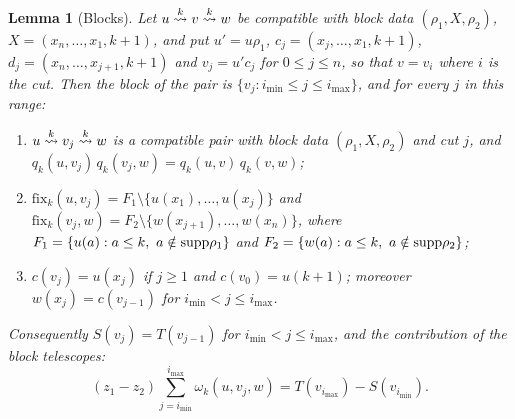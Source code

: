 \documentclass{amsart}
\newtheorem{lemma}{Lemma}[section]
\theoremstyle{definition}
\theoremstyle{remark}
\numberwithin{equation}{section}
\newcommand{\xrightsquigarrow}[2][]{%
	\mathrel{\mathop{\rightsquigarrow}\limits^{\scriptstyle #2}%
	\ifx\hfuzz#1\hfuzz\else_{\scriptstyle #1}\fi}%
}
\newcommand{\tom}[1]{\ensuremath{\xrightsquigarrow{#1}}}
\newcommand{\fx}{\mathrm{fix}}
\begin{document}
\begin{lemma}[Blocks] \label{lemma:blocks}
Let $u\tom{k}v\tom{k}w$ be compatible with block data $(\rho_1,X,\rho_2)$, $X=(x_n,\ldots,x_1,k+1)$, and put $u'=u\rho_1$, $c_j=(x_j,\ldots,x_1,k+1)$, $d_j=(x_n,\ldots,x_{j+1},k+1)$ and $v_j=u'c_j$ for $0\leq j\leq n$, so that $v=v_i$ where $i$ is the cut. Then the block of the pair is $\{v_j: i_{\min}\leq j\leq i_{\max}\}$, and for every $j$ in this range:
\begin{enumerate}
\item[(i)] $u\tom{k}v_j\tom{k}w$ is a compatible pair with block data $(\rho_1,X,\rho_2)$ and cut $j$, and $q_k(u,v_j)\,q_k(v_j,w)=q_k(u,v)\,q_k(v,w)$;
\item[(ii)] $\fx_k(u,v_j)=F_1\setminus\{u(x_1),\ldots,u(x_j)\}$ and $\fx_k(v_j,w)=F_2\setminus\{w(x_{j+1}),\ldots,w(x_n)\}$, where $F_1=\{u(a):a\leq k,\ a\notin\mathrm{supp}\rho_1\}$ and $F_2=\{w(a):a\leq k,\ a\notin\mathrm{supp}\rho_2\}$;
\item[(iii)] $c(v_j)=u(x_j)$ if $j\geq1$ and $c(v_0)=u(k+1)$; moreover $w(x_j)=c(v_{j-1})$ for $i_{\min}<j\leq i_{\max}$.
\end{enumerate}
Consequently $S(v_j)=T(v_{j-1})$ for $i_{\min}<j\leq i_{\max}$, and the contribution of the block telescopes:
$$(z_1-z_2)\sum_{j=i_{\min}}^{i_{\max}}\omega_k(u,v_j,w)=T(v_{i_{\max}})-S(v_{i_{\min}}).$$
\end{lemma}
\end{document}
